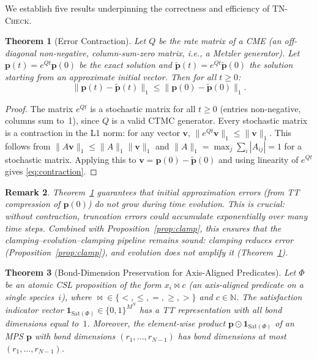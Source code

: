 \documentclass[11pt]{article}
\newtheorem{theorem}{Theorem}
\newtheorem{remark}[theorem]{Remark}
\newcommand{\tncheck}{\textsc{TN-Check}}
\newcommand{\norm}[1]{\lVert #1 \rVert}
\newcommand{\N}{\mathbb{N}}
\newcommand{\Sat}{\mathrm{Sat}}
\begin{document}
We establish five results underpinning the correctness and efficiency
of \tncheck{}.

\begin{theorem}[Error Contraction]\label{thm:contraction}
Let $Q$ be the rate matrix of a CME (an off-diagonal non-negative,
column-sum-zero matrix, i.e., a Metzler generator).
Let $\mathbf{p}(t) = e^{Qt}\mathbf{p}(0)$ be the exact solution and
$\tilde{\mathbf{p}}(t) = e^{Qt}\tilde{\mathbf{p}}(0)$ the solution
starting from an approximate initial vector.
Then for all $t \geq 0$:
\begin{equation}\label{eq:contraction}
  \norm{\mathbf{p}(t) - \tilde{\mathbf{p}}(t)}_1
  \leq \norm{\mathbf{p}(0) - \tilde{\mathbf{p}}(0)}_1.
\end{equation}
\end{theorem}

\begin{proof}
The matrix $e^{Qt}$ is a stochastic matrix for all $t \geq 0$
(entries non-negative, columns sum to~1), since $Q$ is a valid
CTMC generator.
Every stochastic matrix is a contraction in the L1 norm:
for any vector $\mathbf{v}$,
$\norm{e^{Qt}\mathbf{v}}_1 \leq \norm{\mathbf{v}}_1$.
This follows from $\norm{A\mathbf{v}}_1 \leq \norm{A}_1 \norm{\mathbf{v}}_1$
and $\norm{A}_1 = \max_j \sum_i |A_{ij}| = 1$ for a stochastic matrix.
Applying this to $\mathbf{v} = \mathbf{p}(0) - \tilde{\mathbf{p}}(0)$
and using linearity of $e^{Qt}$ gives \eqref{eq:contraction}.
\end{proof}

\begin{remark}
Theorem~\ref{thm:contraction} guarantees that initial approximation
errors (from TT compression of $\mathbf{p}(0)$) do not grow during
time evolution.
This is crucial: without contraction, truncation errors could
accumulate exponentially over many time steps.
Combined with Proposition~\ref{prop:clamp}, this ensures that the
clamping--evolution--clamping pipeline remains sound: clamping reduces
error (Proposition~\ref{prop:clamp}), and evolution does not amplify it
(Theorem~\ref{thm:contraction}).
\end{remark}

\begin{theorem}[Bond-Dimension Preservation for Axis-Aligned Predicates]\label{thm:bond-preservation}
Let $\Phi$ be an atomic CSL proposition of the form $x_i \bowtie c$
(an axis-aligned predicate on a single species~$i$), where
${\bowtie} \in \{<,\leq,=,\geq,>\}$ and $c \in \N$.
The satisfaction indicator vector
$\mathbf{1}_{\Sat(\Phi)} \in \{0,1\}^{M^N}$
has a TT representation with all bond dimensions equal to~$1$.
Moreover, the element-wise product
$\mathbf{p} \odot \mathbf{1}_{\Sat(\Phi)}$ of an MPS
$\mathbf{p}$ with bond dimensions $(r_1, \ldots, r_{N-1})$
has bond dimensions at most $(r_1, \ldots, r_{N-1})$.
\end{theorem}
\end{document}
